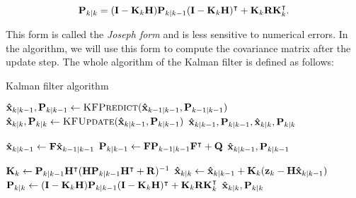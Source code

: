 \begin{equation}
    \vecat{P}{k|k} =
    (\mathbf{I} - \vecat{K}{k}\mathbf{H})\vecat{P}{k|k-1}
    (\mathbf{I} - \vecat{K}{k}\mathbf{H})^\intercal
    + \vecat{K}{k} \mathbf{R} \vecat{K}{k}^\intercal.
\end{equation}

This form is called the \textit{Joseph form} and is less sensitive to numerical errors. In the algorithm, we will use this form to compute the covariance matrix after the update step. The whole algorithm of the Kalman filter is defined as follows:

\begin{algorithm}
\caption{Kalman filter algorithm}\label{alg:kf}
\begin{algorithmic}[1]
        \State $\vecat{\hat{x}}{k|k-1}, \vecat{P}{k|k-1} 
            \gets \Call{KFPredict}{\vecat{\hat{x}}{k-1|k-1}, \vecat{P}{k-1|k-1}}$
        \State $\vecat{\hat{x}}{k|k}, \vecat{P}{k|k} 
            \gets \Call{KFUpdate}{\vecat{\hat{x}}{k|k-1}, \vecat{P}{k|k-1}}$
        \State \Return $\vecat{\hat{x}}{k|k-1}, \vecat{P}{k|k-1}, \vecat{\hat{x}}{k|k}, \vecat{P}{k|k}$
    \EndProcedure
    
    \item[]
        \State 
            $\vecat{\hat{x}}{k|k-1} \gets \mathbf{F} \vecat{\hat{x}}{k-1|k-1}$
        \State
            $\vecat{P}{k|k-1} \gets \mathbf{F} \vecat{P}{k-1|k-1} \mathbf{F}^\intercal + \mathbf{Q}$
        \State \Return $\vecat{\hat{x}}{k|k-1}, \vecat{P}{k|k-1}$
    \EndProcedure

    \item[]
        \State
            $\vecat{K}{k} \gets \vecat{P}{k|k-1}\mathbf{H}^\intercal(\mathbf{H}\vecat{P}{k|k-1}\mathbf{H}^\intercal + \mathbf{R})^{-1}$
        \State
            $\vecat{\hat{x}}{k|k} \gets \vecat{\hat{x}}{k|k-1} + \vecat{K}{k}(\vecat{z}{k} - \mathbf{H}\vecat{\hat{x}}{k|k-1})$
        \State
            $\vecat{P}{k|k} \gets (\mathbf{I} - \vecat{K}{k}\mathbf{H})\vecat{P}{k|k-1} (\mathbf{I} - \vecat{K}{k}\mathbf{H})^\intercal + \vecat{K}{k} \mathbf{R} \vecat{K}{k}^\intercal$
        \State \Return $\vecat{\hat{x}}{k|k}, \vecat{P}{k|k}$
    \EndProcedure
\end{algorithmic}
\end{algorithm}

